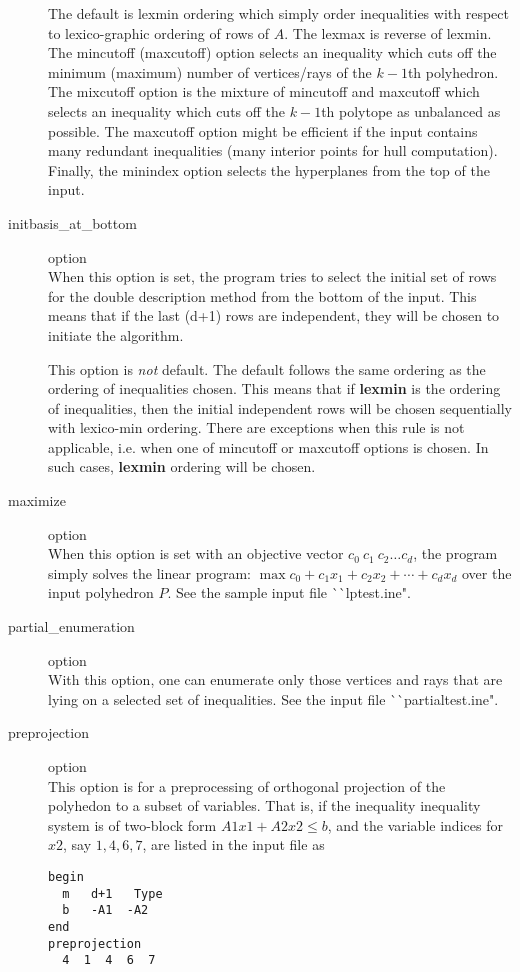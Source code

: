 \begin{description}
The default is lexmin ordering which simply order inequalities
with respect to lexico-graphic ordering of rows of $A$.  The lexmax
is reverse of lexmin.  The mincutoff (maxcutoff) option selects an inequality which
cuts off the minimum (maximum) number of vertices/rays of the $k-1$th polyhedron. 
The mixcutoff option is the mixture of mincutoff and maxcutoff which selects
an inequality which cuts off the $k-1$th polytope as unbalanced as possible.
The maxcutoff option might be efficient if the input contains
many redundant inequalities (many interior points for hull computation).
Finally, the minindex option selects the hyperplanes from the top of
the input.

\item[initbasis\_at\_bottom] option\\
When this option is set, the program tries to select
the initial set of rows for the double description
method from the bottom of the input.  This means that
if the last (d+1) rows are independent, 
they will be chosen to initiate the algorithm.

This option is {\em not\/} default. The default
follows the same ordering as the ordering
of inequalities chosen.  This means that if {\bf lexmin\/}
is the ordering of inequalities, then the initial 
independent rows
will be chosen sequentially with lexico-min ordering.
There are exceptions when this rule
is not applicable, i.e. when one of mincutoff or maxcutoff
options is chosen. In such cases, {\bf lexmin\/}
ordering will be chosen.

\item[maximize] option\\
When this option is set with an objective vector 
$c_0\: c_1 \: c_2 \ldots c_d$, the program
simply solves the linear program: $\max c_0 + c_1 x_1 + c_2 x_2 +\cdots + c_d x_d$
over the input polyhedron $P$.
See the sample input file ^^ ^^ lptest.ine".

\item[partial\_enumeration] option\\
With this option, one can enumerate only those
vertices and rays that are lying on a selected set of inequalities.
See the input file ^^ ^^ partialtest.ine".

\item[preprojection] option\\
This option is for a preprocessing
 of orthogonal projection of the polyhedon to a subset of variables.  
That is, if the inequality inequality system is of two-block form  $A1 x1 + A2 x2 \le b$, 
and the variable indices for $x2$, say $1, 4, 6, 7$,
are listed in the input file as
\begin{verbatim}
begin
  m   d+1   Type
  b   -A1  -A2
end
preprojection
  4  1  4  6  7
\end{verbatim}
    

\end{description}
